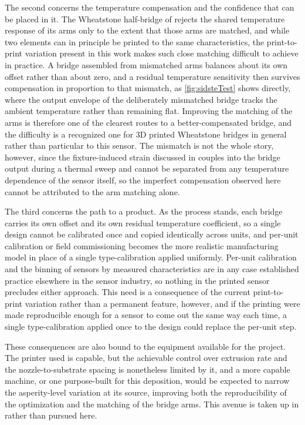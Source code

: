 The second concerns the temperature compensation and the confidence that can be placed in it. The Wheatstone half-bridge of  rejects the shared temperature response of its arms only to the extent that those arms are matched, and while two elements can in principle be printed to the same characteristics, the print-to-print variation present in this work makes such close matching difficult to achieve in practice. A bridge assembled from mismatched arms balances about its own offset rather than about zero, and a residual temperature sensitivity then survives compensation in proportion to that mismatch, as \cref{fig:sidsteTest} shows directly, where the output envelope of the deliberately mismatched bridge tracks the ambient temperature rather than remaining flat. Improving the matching of the arms is therefore one of the clearest routes to a better-compensated bridge, and the difficulty is a recognized one for 3D printed Wheatstone bridges in general~\cite{3DprintWheatstoneStrain} rather than particular to this sensor. The mismatch is not the whole story, however, since the fixture-induced strain discussed in  couples into the bridge output during a thermal sweep and cannot be separated from any temperature dependence of the sensor itself, so the imperfect compensation observed here cannot be attributed to the arm matching alone.

The third concerns the path to a product. As the process stands, each bridge carries its own offset and its own residual temperature coefficient, so a single design cannot be calibrated once and copied identically across units, and per-unit calibration or field commissioning becomes the more realistic manufacturing model in place of a single type-calibration applied uniformly. Per-unit calibration and the binning of sensors by measured characteristics are in any case established practice elsewhere in the sensor industry, so nothing in the printed sensor precludes either approach. This need is a consequence of the current print-to-print variation rather than a permanent feature, however, and if the printing were made reproducible enough for a sensor to come out the same way each time, a single type-calibration applied once to the design could replace the per-unit step.

These consequences are also bound to the equipment available for the project. The printer used is capable, but the achievable control over extrusion rate and the nozzle-to-substrate spacing is nonetheless limited by it, and a more capable machine, or one purpose-built for this deposition, would be expected to narrow the asperity-level variation at its source, improving both the reproducibility of the optimization and the matching of the bridge arms. This avenue is taken up in  rather than pursued here.

